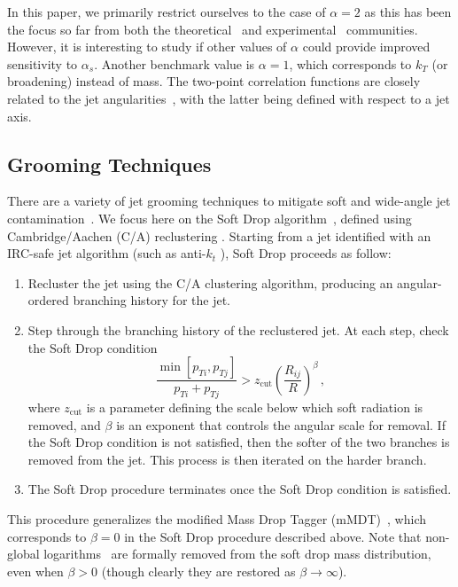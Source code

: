 \documentclass[11pt]{cernrep}
\begin{document}
In this paper, we primarily restrict ourselves to the case of $\alpha=2$ as this has been the focus so far from both the theoretical~\cite{Frye:2016okc,Frye:2016aiz,Marzani:2017kqd,Marzani:2017mva} and experimental~\cite{Aaboud:2017qwh,CMS-PAS-SMP-16-010} communities.
%
However, it is interesting to study if other values of $\alpha$ could provide improved sensitivity to $\alpha_s$.
%
Another benchmark value is $\alpha=1$, which corresponds to $k_T$ (or broadening) instead of mass.
%
The two-point correlation functions are closely related to the jet angularities~\cite{Berger:2003iw,Almeida:2008yp,Ellis:2010rwa,Larkoski:2014pca}, with the latter being defined with respect to a jet axis.


\subsection{Grooming Techniques}\label{jetsub_alphas_sec:groom_tech}

There are a variety of jet grooming techniques to mitigate soft and wide-angle jet contamination~\cite{Butterworth:2008iy,Ellis:2009su,Ellis:2009me,Krohn:2009th,Dasgupta:2013ihk,Larkoski:2014wba}.
%
We focus here on the Soft Drop algorithm~\cite{Larkoski:2014wba}, defined using Cambridge/Aachen (C/A) reclustering \cite{Dokshitzer:1997in,Wobisch:1998wt,Wobisch:2000dk}.
%
Starting from a jet identified with an IRC-safe jet algorithm (such as anti-$k_t$ \cite{Cacciari:2008gp}), Soft Drop proceeds as follow:
%
\begin{enumerate}
%
\item Recluster the jet using the C/A clustering algorithm, producing an angular-ordered branching history for the jet.
%
\item Step through the branching history of the reclustered jet.  At each step, check the Soft Drop condition
%
\begin{equation}\label{jetsub_alphas_eq:sd_cut}
\frac{\min\left[ p_{Ti}, p_{Tj}  \right]}{p_{Ti}+p_{Tj}}> z_{\mathrm{cut}} \left(   \frac{R_{ij}}{R}\right)^\beta \,,
\end{equation}
%
where $z_{\mathrm{cut}} $ is a parameter defining the scale below which soft radiation is removed, and $\beta$ is an exponent that controls the angular scale for removal.
%
If the Soft Drop condition is not satisfied, then the softer of the two branches is removed from the jet.  This process is then iterated on the harder branch.
%
\item The Soft Drop procedure terminates once the Soft Drop condition is satisfied.
%
\end{enumerate}
%
This procedure generalizes the modified Mass Drop Tagger (mMDT)~\cite{Dasgupta:2013ihk}, which corresponds to $\beta=0$ in the Soft Drop procedure described above.
%
Note that non-global logarithms~\cite{Dasgupta:2001sh} are formally removed from the soft drop mass distribution, even when $\beta>0$ (though clearly they are restored as $\beta\rightarrow\infty$).
\end{document}
